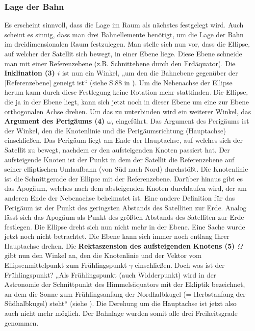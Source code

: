\subsubsection{Lage der Bahn}
Es erscheint sinnvoll, dass die Lage im Raum als nächstes festgelegt wird. Auch scheint es sinnig, dass man drei Bahnellemente benötigt, um die Lage der Bahn im dreidimensionalen Raum festzulegen. 
\newpar
Man stelle sich nun vor, dass die Ellipse, auf welcher der Satellit sich bewegt, in einer Ebene liege.  Diese Ebene schneide man mit einer Referenzebene (z.B. Schnittebene durch den Erdäquator). Die \textbf{Inklination (3) \ensuremath{i}} ist nun ein Winkel, „um den die Bahnebene gegenüber der [Referenzebene] geneigt ist“ (siehe S.88 in \cite{HandRaum}). Um die Nebenachse der Ellipse herum kann durch diese Festlegung keine Rotation mehr stattfinden. Die Ellipse, die ja in der Ebene liegt, kann sich jetzt noch in dieser Ebene um eine zur Ebene orthogonalen Achse drehen. Um das zu unterbinden wird ein weiterer Winkel, das \textbf{Argument des Perigäums (4) \ensuremath{\omega}}, eingeführt. Das Argument des Perigäums ist der Winkel, den die Knotenlinie und die Perigäumsrichtung (Hauptachse) einschließen. Das Perigäum liegt am Ende der Hauptachse, auf welches sich der Satellit zu bewegt, nachdem er den aufsteigenden Knoten passiert hat. Der aufsteigende Knoten ist der Punkt in dem der Satellit die Referenzebene auf seiner elliptischen Umlaufbahn (von Süd nach Nord) durchstößt. Die Knotenlinie ist die Schnittgerade der Ellipse mit der Referenzebene. Darüber hinaus gibt es das Apogäum, welches nach dem absteigenden Knoten durchlaufen wird, der am anderen Ende der Nebenachse beheimatet ist. Eine andere Definition für das Perigäum ist der Punkt des geringsten Abstands des Satelliten zur Erde. Analog lässt sich das Apogäum als Punkt des größten Abstands des Satelliten zur Erde festlegen. Die Ellipse dreht sich nun nicht mehr in der Ebene. Eine Sache wurde jetzt noch nicht betrachtet. Die Ebene kann sich immer noch entlang Ihrer Hauptachse drehen. Die \textbf{Rektaszension des aufsteigenden Knotens (5) \ensuremath{\Omega}} gibt nun den Winkel an, den die Knotenlinie und der Vektor vom Ellipsenmittelpunkt zum Frühlingspunkt \ensuremath{\gamma} einschließen. Doch was ist der Frühlingspunkt? „Als Frühlingspunkt (auch Widderpunkt) wird in der Astronomie der Schnittpunkt des Himmelsäquators mit der Ekliptik bezeichnet, an dem die Sonne zum Frühlingsanfang der Nordhalbkugel (= Herbstanfang der Südhalbkugel) steht“ (siehe \cite{Wiki:Frue}). Die Derehung um die Hauptachse ist jetzt also auch nicht mehr möglich. Der Bahnlage wurden somit alle drei Freiheitsgrade genommen.     
